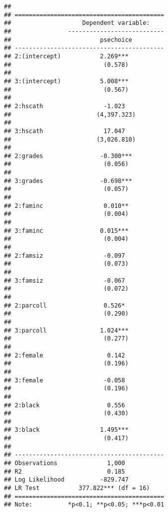 \documentclass[
]{book}
\begin{document}
\begin{verbatim}
## 
## ==========================================
##                    Dependent variable:    
##                ---------------------------
##                         psechoice         
## ------------------------------------------
## 2:(intercept)           2.269***          
##                          (0.578)          
##                                           
## 3:(intercept)           5.008***          
##                          (0.567)          
##                                           
## 2:hscath                 -1.023           
##                        (4,397.323)        
##                                           
## 3:hscath                 17.047           
##                        (3,026.810)        
##                                           
## 2:grades                -0.300***         
##                          (0.056)          
##                                           
## 3:grades                -0.698***         
##                          (0.057)          
##                                           
## 2:faminc                 0.010**          
##                          (0.004)          
##                                           
## 3:faminc                0.015***          
##                          (0.004)          
##                                           
## 2:famsiz                 -0.097           
##                          (0.073)          
##                                           
## 3:famsiz                 -0.067           
##                          (0.072)          
##                                           
## 2:parcoll                0.526*           
##                          (0.290)          
##                                           
## 3:parcoll               1.024***          
##                          (0.277)          
##                                           
## 2:female                  0.142           
##                          (0.196)          
##                                           
## 3:female                 -0.058           
##                          (0.196)          
##                                           
## 2:black                   0.556           
##                          (0.430)          
##                                           
## 3:black                 1.495***          
##                          (0.417)          
##                                           
## ------------------------------------------
## Observations              1,000           
## R2                        0.185           
## Log Likelihood          -829.747          
## LR Test           377.822*** (df = 16)    
## ==========================================
## Note:          *p<0.1; **p<0.05; ***p<0.01
\end{verbatim}
\end{document}
